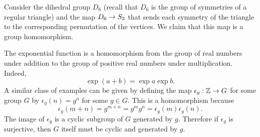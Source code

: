 \begin{example}
    Consider the dihedral group \(D_6\) (recall that \(D_6\) is the group of
    symmetries of a regular triangle) and the map \(D_6 \to S_{3}\) that
    sends each symmetry of the triangle to the corresponding permutation of the
    vertices. We claim that this map is a group homomorphism.
\end{example}

\begin{example}
    The exponential function is a homomorphism from the group of real numbers
    under addition to the group of positive real numbers under multiplication.
    Indeed,
    \[
        \exp (a + b) = \exp a \exp b.
    \]
    A similar class of examples can be given by defining the map \(\epsilon_g :
    \mathbb{Z} \to G\) for some group \(G\) by \(\epsilon_g(n) = g^n\) for some \(g \in
    G\). This is a homomorphism because
    \[
        \epsilon_g(m + n) = g^{m + n} = g^m g^n = \epsilon_g(m) \epsilon_g(n).
    \]
    The image of \(\epsilon_g\) is a cyclic subgroup of \(G\) generated by
    \(g\). Therefore if \(\epsilon_g\) is surjective, then \(G\) itself must be
    cyclic and generated by \(g\).
\end{example}

